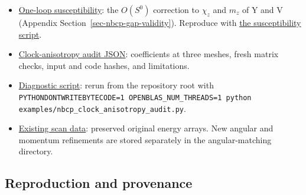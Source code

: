 \begin{itemize}
  pinning of the absolute angle against the free distance at
  \(J_{PD}=0.010\) meV, and honeycomb networks of forward walls with the
  bulk winding at each junction
  (Section~\ref{sec-nbcp-y-density-wall}). Reproduce with
  \href{../../../examples/nbcp_y_wall_junction.py}{the junction script}.
\item
  \href{../../../data-space/verification/261002-one-loop-susceptibility/one-loop-susceptibility.json}{One-loop
  susceptibility}: the \(O(S^0)\) correction to \(\chi_z\) and
  \(m_z\) of Y and V (Appendix Section~\ref{sec-nbcp-gap-validity}).
  Reproduce with
  \href{../../../examples/nbcp_one_loop_susceptibility.py}{the
  susceptibility script}.
\item
  \href{../../../data-space/verification/260916-clock-anisotropy/clock-anisotropy-audit.json}{Clock-anisotropy
  audit JSON}: coefficients at three meshes, fresh matrix checks, input
  and code hashes, and limitations.
\item
  \href{../../../examples/nbcp_clock_anisotropy_audit.py}{Diagnostic
  script}: rerun from the repository root with
  {\small\texttt{\nolinkurl{PYTHONDONTWRITEBYTECODE=1 OPENBLAS_NUM_THREADS=1 python examples/nbcp_clock_anisotropy_audit.py}}}.
\item
  \href{../../../data-space/verification/260912-pseudo-goldstone}{Existing
  scan data}: preserved original energy arrays. New angular and momentum
  refinements are stored separately in the angular-matching directory.
\end{itemize}

\clearpage

\subsection{Reproduction and provenance}\label{sec-reproduction}

